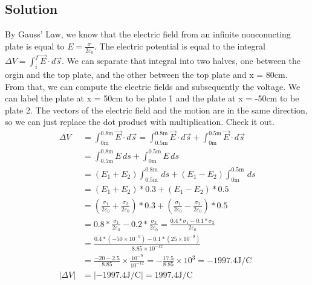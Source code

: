 \documentclass[12pt]{article}
\begin{document}
\subsection*{Solution}
By Gauss' Law, we know that the electric field from an infinite nonconucting plate is equal to $E = \frac{\sigma}{2\varepsilon_0}$.
The electric potential is equal to the integral $\Delta V = \int_{i}^{f} \vec{E}\cdot d\vec{s}$.
We can separate that integral into two halves, one between the orgin and the top plate, and the other between the top plate and x = 80cm.
From that, we can compute the electric fields and subsequently the voltage.
We can label the plate at x = 50cm to be plate 1 and the plate at x = -50cm to be plate 2.
The vectors of the electric field and the motion are in the same direction, so we can just replace the dot product with multiplication.
Check it out.
\begin{align*}
    \Delta V    &=  \int_{0\unit{\meter}}^{0.8\unit{\meter}} \vec{E} \cdot d\vec{s}
        =   \int_{0.5\unit{\meter}}^{0.8\unit{\meter}} \vec{E} \cdot d\vec{s} + \int_{0\unit{\meter}}^{0.5\unit{\meter}} \vec{E} \cdot d\vec{s}\\
        &=  \int_{0.5\unit{\meter}}^{0.8\unit{\meter}} E \,ds + \int_{0\unit{\meter}}^{0.5\unit{\meter}} E \,ds\\
        &=  (E_1 + E_2) \int_{0.5\unit{\meter}}^{0.8\unit{\meter}} \,ds + (E_1 - E_2) \int_{0\unit{\meter}}^{0.5\unit{\meter}} \,ds\\
        &=  (E_1 + E_2)*0.3 + (E_1 - E_2)*0.5\\
        &=  \left(\frac{\sigma_1}{2\varepsilon_0} + \frac{\sigma_2}{2\varepsilon_0}\right)*0.3 + \left(\frac{\sigma_1}{2\varepsilon_0} - \frac{\sigma_2}{2\varepsilon_0}\right)*0.5\\
        &=  0.8*\frac{\sigma_1}{2\varepsilon_0} - 0.2*\frac{\sigma_2}{2\varepsilon_0}
        =   \frac{0.4*\sigma_1 - 0.1*\sigma_2}{2\varepsilon_0}\\
        &=  \frac{0.4*(-50 \times 10^{-9}) - 0.1*(25 \times 10^{-9})}{8.85 \times 10^{-12}}\\
        &=  \frac{-20 - 2.5}{8.85} \times \frac{10^{-9}}{10^{-12}}
        =   -\frac{17.5}{8.85} \times 10^3
        =   -1997.4 \unit{\joule/\coulomb}\\
    \left|\Delta V\right|   &=  \left|-1997.4 \unit{\joule/\coulomb}\right|
        =   \boxed{1997.4 \unit{\joule/\coulomb}}
\end{align*}
\pagebreak
\end{document}
